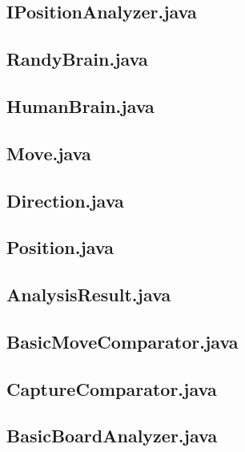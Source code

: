 \documentclass [12pt ,a4paper, english]{scrartcl}
\theoremstyle{plain}
\theoremstyle{definition}
\theoremstyle{remark}
\begin{document}
\subsection{IPositionAnalyzer.java}


\subsection{RandyBrain.java}


\subsection{HumanBrain.java}


\subsection{Move.java}


\subsection{Direction.java}


\subsection{Position.java}


\subsection{AnalysisResult.java}


\subsection{BasicMoveComparator.java}


\subsection{CaptureComparator.java}


\subsection{BasicBoardAnalyzer.java}

\end{document}
